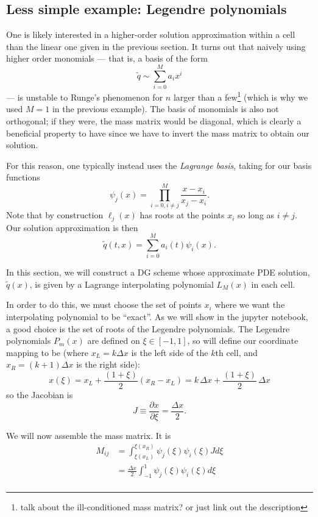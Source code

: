 \documentclass[12pt]{article}
\numberwithin{equation}{section}
\begin{document}
\subsection{Less simple example: Legendre polynomials}

One is likely interested in a higher-order solution approximation within a cell than the linear one given in the previous section.
It turns out that naively using higher order monomials --- that is, a basis of the form 
\begin{equation}
\tilde{q} \sim \sum_{i=0}^M a_i x^i
\end{equation}
--- is unstable to Runge's phenomenon for $n$ larger than a few\footnote{talk about the ill-conditioned mass matrix? or just link out the description} (which is why we used $M=1$ in the previous example).
The basis of monomials is also not orthogonal; if they were, the mass matrix would be diagonal, which is clearly a beneficial property to have since we have to invert the mass matrix to obtain our solution.

For this reason, one typically instead uses the \textit{Lagrange basis}, taking for our basis functions
\begin{equation}
\psi_j(x) = \prod_{i=0, i \neq j}^{M} \frac{x - x_i}{x_j - x_i}.
\end{equation}
Note that by construction $\ell_j(x)$ has roots at the points $x_i$ so long as $i \neq j$.
Our solution approximation is then
\begin{equation}
\tilde{q}(t, x) = \sum_{i=0}^{M} a_i(t) \psi_i(x).
\end{equation}

In this section, we will construct a DG scheme whose approximate PDE solution, $\tilde{q}(x)$, is given by a Lagrange interpolating polynomial $L_M(x)$ in each cell.

In order to do this, we must choose the set of points $x_i$ where we want the interpolating polynomial to be ``exact''.
As we will show in the jupyter notebook, a good choice is the set of roots of the Legendre polynomials.
The Legendre polynomials $P_m(x)$ are defined on $\xi \in [-1, 1]$, so will define our coordinate mapping to be (where $x_L = k \Delta x$ is the left side of the $k$th cell, and $x_R = (k+1) \Delta x$ is the right side):
\begin{equation}
x(\xi) = x_L + \frac{(1+\xi)}{2} (x_R - x_L) = k \, \Delta x + \frac{(1+\xi)}{2} \, \Delta x
\end{equation}
so the Jacobian is
\begin{equation}
J \equiv \frac{\partial x}{\partial \xi} = \frac{\Delta x}{2}.
\end{equation}

We will now assemble the mass matrix.
It is
\begin{equation}
\begin{aligned}
M_{ij} &= \int_{\xi(x_L)}^{\xi(x_R)} \psi_j(\xi) \psi_i (\xi) J d\xi \\
&= \frac{\Delta x}{2} \int_{-1}^{1} \psi_j(\xi) \psi_i (\xi) d\xi \\
\end{aligned}
\end{equation}
\end{document}
